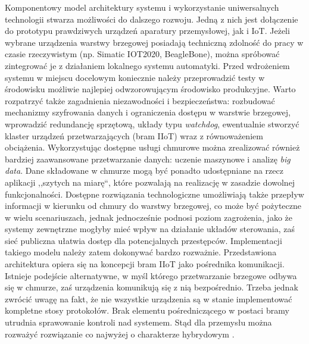 \documentclass[a4paper, 12pt, twoside]{article}
\begin{document}
Komponentowy model architektury systemu i wykorzystanie uniwersalnych technologii
stwarza możliwości do dalszego rozwoju. Jedną z nich jest dołączenie do prototypu
prawdziwych urządzeń aparatury przemysłowej, jak i IoT. Jeżeli wybrane urządzenia
warstwy brzegowej posiadają techniczną zdolność do pracy w czasie rzeczywistym
(np. Simatic IOT2020, BeagleBone), 
można spróbować zintegrować je z działaniem lokalnego systemu automatyki. Przed wdrożeniem 
systemu w miejscu docelowym koniecznie należy przeprowadzić testy w środowisku
możliwie najlepiej odwzorowującym środowisko produkcyjne. Warto rozpatrzyć także
zagadnienia niezawodności i bezpieczeństwa: rozbudować mechanizmy szyfrowania danych
i ograniczenia dostępu w warstwie brzegowej, wprowadzić redundancję sprzętową,
układy typu \emph{watchdog}, ewentualnie stworzyć klaster urządzeń przetwarzających 
(bram IIoT) wraz z równoważeniem obciążenia. Wykorzystując dostępne usługi 
chmurowe można zrealizować również bardziej zaawansowane przetwarzanie danych:
uczenie maszynowe i analizę \emph{big data}. Dane składowane w chmurze mogą być
ponadto udostępniane na rzecz aplikacji ,,szytych na miarę``, które pozwalają 
na realizację w zasadzie dowolnej funkcjonalności. Dostępne rozwiązania technologiczne 
umożliwiają także przepływ informacji w kierunku od chmury do warstwy brzegowej,
co może być pożyteczne w wielu scenariuszach, jednak jednocześnie podnosi 
poziom zagrożenia, jako że systemy zewnętrzne mogłyby mieć wpływ na działanie 
układów sterowania, zaś sieć publiczna ułatwia dostęp dla potencjalnych przestępców. 
Implementacji takiego modelu należy zatem dokonywać bardzo rozważnie. 
Przedstawiona architektura opiera się na koncepcji bram IIoT jako pośrednika 
komunikacji. Istnieje podejście alternatywne, w myśl którego przetwarzanie brzegowe
odbywa się w chmurze, zaś urządzenia komunikują się z nią bezpośrednio. Trzeba 
jednak zwrócić uwagę na fakt, że nie wszystkie urządzenia są w stanie implementować 
kompletne stosy protokołów. Brak elementu pośredniczącego w postaci bramy utrudnia 
sprawowanie kontroli nad systemem. Stąd dla przemysłu można rozważyć 
rozwiązanie co najwyżej o charakterze hybrydowym \cite{analysis-of-different-iot-protocols}. 

\newpage
\printbibliography
\end{document}
